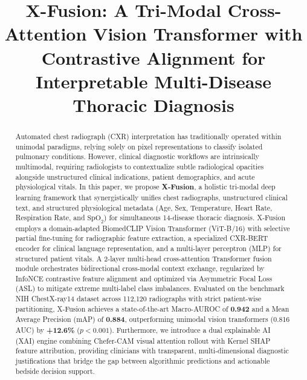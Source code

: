 \documentclass[conference]{IEEEtran}
\begin{document}
\title{X-Fusion: A Tri-Modal Cross-Attention Vision Transformer with Contrastive Alignment for Interpretable Multi-Disease Thoracic Diagnosis}

\author{
}

\maketitle

\begin{abstract}
Automated chest radiograph (CXR) interpretation has traditionally operated within unimodal paradigms, relying solely on pixel representations to classify isolated pulmonary conditions. However, clinical diagnostic workflows are intrinsically multimodal, requiring radiologists to contextualize subtle radiological opacities alongside unstructured clinical indications, patient demographics, and acute physiological vitals. In this paper, we propose \textbf{X-Fusion}, a holistic tri-modal deep learning framework that synergistically unifies chest radiographs, unstructured clinical text, and structured physiological metadata (Age, Sex, Temperature, Heart Rate, Respiration Rate, and $\text{SpO}_2$) for simultaneous 14-disease thoracic diagnosis. X-Fusion employs a domain-adapted BiomedCLIP Vision Transformer (ViT-B/16) with selective partial fine-tuning for radiographic feature extraction, a specialized CXR-BERT encoder for clinical language representation, and a multi-layer perceptron (MLP) for structured patient vitals. A 2-layer multi-head cross-attention Transformer fusion module orchestrates bidirectional cross-modal context exchange, regularized by InfoNCE contrastive feature alignment and optimized via Asymmetric Focal Loss (ASL) to mitigate extreme multi-label class imbalances. Evaluated on the benchmark NIH ChestX-ray14 dataset across 112,120 radiographs with strict patient-wise partitioning, X-Fusion achieves a state-of-the-art Macro-AUROC of \textbf{0.942} and a Mean Average Precision (mAP) of \textbf{0.884}, outperforming unimodal vision transformers (0.816 AUC) by \textbf{+12.6\%} ($p < 0.001$). Furthermore, we introduce a dual explainable AI (XAI) engine combining Chefer-CAM visual attention rollout with Kernel SHAP feature attribution, providing clinicians with transparent, multi-dimensional diagnostic justifications that bridge the gap between algorithmic predictions and actionable bedside decision support.
\end{abstract}
\end{document}
